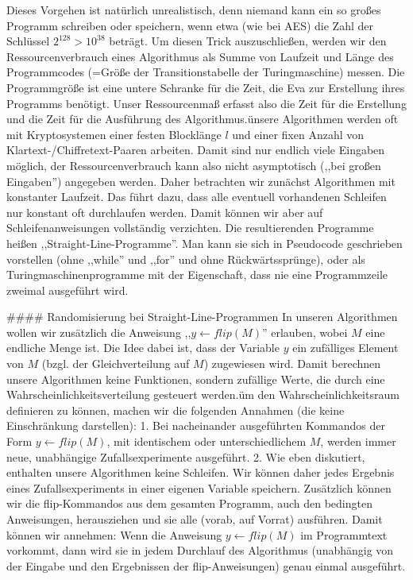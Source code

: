 \documentclass[a4paper]{article}
\begin{document}
\begin{multicols}{3}
Dieses Vorgehen ist natürlich unrealistisch, denn niemand kann ein so großes Programm schreiben oder speichern, wenn etwa (wie bei AES) die Zahl der Schlüssel $2^{128}>10^{38}$ beträgt. Um diesen Trick auszuschließen, werden wir den Ressourcenverbrauch eines Algorithmus als Summe von Laufzeit und Länge des Programmcodes (=Größe der Transitionstabelle der Turingmaschine) messen. Die Programmgröße ist eine untere Schranke für die Zeit, die Eva zur Erstellung ihres Programms benötigt. Unser Ressourcenmaß erfasst also die Zeit für die Erstellung und die Zeit für die Ausführung des Algorithmus.ünsere Algorithmen werden oft mit Kryptosystemen einer festen Blocklänge $l$ und einer fixen Anzahl von Klartext-/Chiffretext-Paaren arbeiten. Damit sind nur endlich viele Eingaben möglich, der Ressourcenverbrauch kann also nicht asymptotisch (,,bei großen Eingaben'') angegeben werden. Daher betrachten wir zunächst Algorithmen mit konstanter Laufzeit. Das führt dazu, dass alle eventuell vorhandenen Schleifen nur konstant oft durchlaufen werden. Damit können wir aber auf Schleifenanweisungen vollständig verzichten. Die resultierenden Programme heißen ,,Straight-Line-Programme''. Man kann sie sich in Pseudocode geschrieben vorstellen (ohne ,,while'' und ,,for'' und ohne Rückwärtssprünge), oder als Turingmaschinenprogramme mit der Eigenschaft, dass nie eine Programmzeile zweimal ausgeführt wird.

#### Randomisierung bei Straight-Line-Programmen
In unseren Algorithmen wollen wir zusätzlich die Anweisung ,,$y\leftarrow flip(M)$'' erlauben, wobei $M$ eine endliche Menge ist. Die Idee dabei ist, dass der Variable $y$ ein zufälliges Element von $M$ (bzgl. der Gleichverteilung auf $M$) zugewiesen wird. Damit berechnen unsere Algorithmen keine Funktionen, sondern zufällige Werte, die durch eine Wahrscheinlichkeitsverteilung gesteuert werden.üm den Wahrscheinlichkeitsraum definieren zu können, machen wir die folgenden Annahmen (die keine Einschränkung darstellen):
1. Bei nacheinander ausgeführten Kommandos der Form $y\leftarrow flip(M)$, mit identischem oder unterschiedlichem $M$, werden immer neue, unabhängige Zufallsexperimente ausgeführt.
2. Wie eben diskutiert, enthalten unsere Algorithmen keine Schleifen. Wir können daher jedes Ergebnis eines Zufallsexperiments in einer eigenen Variable speichern. Zusätzlich können wir die flip-Kommandos aus dem gesamten Programm, auch den bedingten Anweisungen, herausziehen und sie alle (vorab, auf Vorrat) ausführen. Damit können wir annehmen: Wenn die Anweisung $y\leftarrow flip(M)$ im Programmtext vorkommt, dann wird sie in jedem Durchlauf des Algorithmus (unabhängig von der Eingabe und den Ergebnissen der flip-Anweisungen) genau einmal ausgeführt.


\end{multicols}
\end{document}
